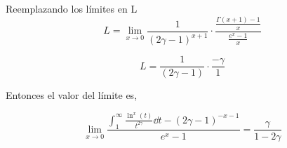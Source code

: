 Reemplazando los límites en L
$$
	L=\lim\limits_{x \to 0} \frac{1}{(2\gamma-1)^{x+1}} \cdot
\frac{\displaystyle \frac{ \Gamma(x+1)-1}{x}}{\displaystyle\frac{{e^x-1}}{x}}
$$

	$$
L= \frac{1}{(2\gamma-1)} \cdot
\frac{-\gamma}{1}
$$

Entonces el valor del límite es,

\begin{LnxRptaBox}
	$$
	 \lim\limits_{x \to 0} 
	 \frac{\displaystyle \int_{1}^{\infty} \frac{\ln^x(t)}{t^{2\gamma}} \dd{t}-(2\gamma-1)^{-x-1}}{e^x-1}=\frac{\gamma}{1-2\gamma} 
	$$
\end{LnxRptaBox}
